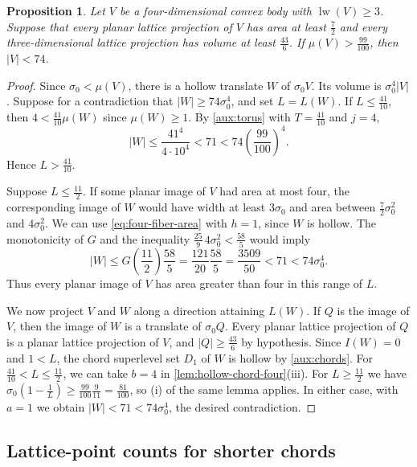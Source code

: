 \documentclass[reqno, 11pt]{article}
\numberwithin{equation}{section}
\newtheorem{proposition}[proposition]{Proposition}
\theoremstyle{definition}
\DeclareMathOperator{\lw}{lw}
\begin{document}
\begin{proposition}\label{aux:four-profile}
Let $V$ be a four-dimensional convex body with $\lw(V)\ge3$.
Suppose that every planar lattice projection of $V$ has area at least
$\frac{7}{2}$ and every three-dimensional lattice projection has volume at least
$\frac{43}{6}$. If $\mu(V)>\frac{99}{100}$, then $|V|<74$.
\end{proposition}

\begin{proof}
Since $\sigma_0<\mu(V)$, there is a hollow translate $W$ of
$\sigma_0V$. Its volume is $\sigma_0^4|V|$. Suppose for a
contradiction that $|W|\ge74\sigma_0^4$, and set $L=L(W)$.
If $L\le\frac{41}{10}$, then $4<\frac{41}{10}\mu(W)$ since
$\mu(W)\ge1$. By \cref{aux:torus} with $T=\frac{41}{10}$ and $j=4$,
\[
 |W|\le\frac{41^4}{4\cdot10^4}<71
       <74\left(\frac{99}{100}\right)^4 .
\]
Hence $L>\frac{41}{10}$.

Suppose $L\le\frac{11}{2}$. If some planar image of $V$ had area
at most four, the corresponding image of $W$ would have width at least
$3\sigma_0$ and area between $\frac{7}{2}\sigma_0^2$ and
$4\sigma_0^2$. We can use \eqref{eq:four-fiber-area} with $h=1$,
since $W$ is hollow. The monotonicity of $G$ and the inequality
$\frac{25}{9}\,4\sigma_0^2<\frac{58}{5}$ would imply
\[
 |W|\le G\left(\frac{11}{2}\right)\frac{58}{5}
       =\frac{121}{20}\frac{58}{5}
       =\frac{3509}{50}<71<74\sigma_0^4 .
\]
Thus every planar image of $V$ has area greater than four in this
range of $L$.

We now project $V$ and $W$ along a direction attaining $L(W)$.
If $Q$ is the image of $V$, then the image of $W$ is a translate of
$\sigma_0Q$. Every planar lattice projection of $Q$ is a planar
lattice projection of $V$, and $|Q|\ge\frac{43}{6}$ by hypothesis.
Since $I(W)=0$ and $1<L$, the chord superlevel set $D_1$ of $W$ is
hollow by \cref{aux:chords}. For $\frac{41}{10}<L\le\frac{11}{2}$,
we can take $b=4$ in \cref{lem:hollow-chord-four}(iii).
For $L\ge\frac{11}{2}$ we have
$\sigma_0(1-\frac{1}{L})\ge\frac{99}{100}\frac{9}{11}
=\frac{81}{100}$, so (i) of the same lemma applies. In either case,
with $a=1$ we obtain $|W|<71<74\sigma_0^4$, the desired contradiction.
\end{proof}

\subsection{Lattice-point counts for shorter chords}
\end{document}
